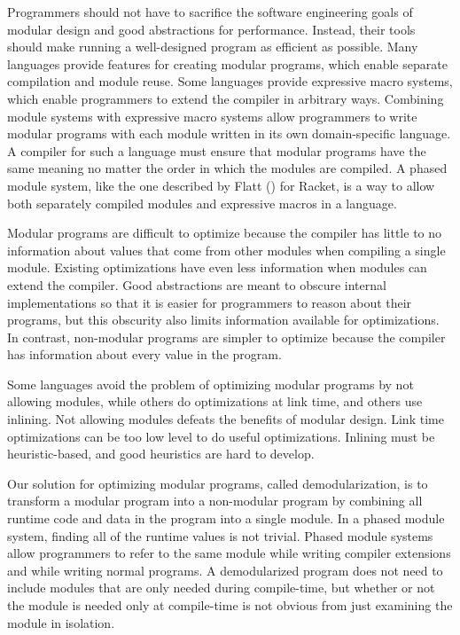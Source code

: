 \documentclass[preprint]{sigplanconf}
\begin{document}
Programmers should not have to sacrifice the software engineering goals of modular design and good abstractions for performance. 
Instead, their tools should make running a well-designed program as efficient as possible. 
Many languages provide features for creating modular programs, which enable separate compilation and module reuse.
Some languages provide expressive macro systems, which enable programmers to extend the compiler in arbitrary ways.
Combining module systems with expressive macro systems allow programmers to write modular programs with each module written in its own domain-specific language.
A compiler for such a language must ensure that modular programs have the same meaning no matter the order in which the modules are compiled.
A phased module system, like the one described by Flatt () for Racket, is a way to allow both separately compiled modules and expressive macros in a language.

Modular programs are difficult to optimize because the compiler has little to no information about values that come from other modules when compiling a single module.
Existing optimizations have even less information when modules can extend the compiler. 
Good abstractions are meant to obscure internal implementations so that it is easier for programmers to reason about their programs, but this obscurity also limits information available for optimizations.  
In contrast, non-modular programs are simpler to optimize because the compiler has information about every value in the program.

Some languages avoid the problem of optimizing modular programs by not allowing modules, while others do optimizations at link time, and others use inlining. 
Not allowing modules defeats the benefits of modular design. 
Link time optimizations can be too low level to do useful optimizations. 
Inlining must be heuristic-based, and good heuristics are hard to develop. 

Our solution for optimizing modular programs, called demodularization, is to transform a modular program into a non-modular program by combining all runtime code and data in the program into a single module.
In a phased module system, finding all of the runtime values is not trivial.
Phased module systems allow programmers to refer to the same module while writing compiler extensions and while writing normal programs.
A demodularized program does not need to include modules that are only needed during compile-time, but whether or not the module is needed only at compile-time is not obvious from just examining the module in isolation. 
\end{document}
